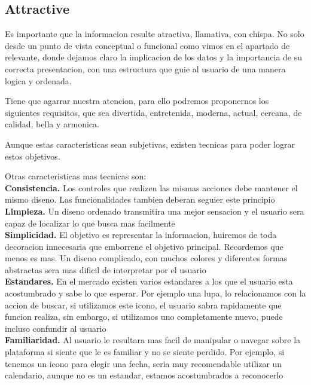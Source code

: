\subsection{Attractive}
Es importante que la informacion resulte atractiva, llamativa, con chispa. No solo desde un punto de vista conceptual
o funcional como vimos en el apartado de relevante, donde dejamos claro la implicacion de los datos y la importancia
de su correcta presentacion, con una estructura que guie al usuario de una manera logica y ordenada.

Tiene que agarrar nuestra atencion, para ello podremos proponernos los siguientes requisitos, que sea divertida, entretenida,
moderna, actual, cercana, de calidad, bella y armonica.

Aunque estas caracteristicas sean subjetivas, existen tecnicas para poder lograr estos objetivos.

Otras caracteristicas mas tecnicas son:\\
 
\textbf{Consistencia.} Los controles que realizen las mismas acciones debe mantener el mismo diseno. Las funcionalidades
tambien deberan seguier este principio\\

\textbf{Limpieza.} Un diseno ordenado transmitira una mejor sensacion y el usuario sera capaz de localizar lo que busca
mas facilmente\\

\textbf{Simplicidad.} El objetivo es representar la informacion, huiremos de toda decoracion innecesaria que emborrene
el objetivo principal. Recordemos que menos es mas. Un diseno complicado, con muchos colores y diferentes formas abstractas
sera mas dificil de interpretar por el usuario\\


\textbf{Estandares.} En el mercado existen varios estandares a los que el usuario esta acostumbrado y sabe lo que esperar.
Por ejemplo una lupa, lo relacionamos con la accion de buscar, si utilizamos este icono, el usuario sabra rapidamente que
funcion realiza, sin embargo, si utilizamos uno completamente nuevo, puede incluso confundir al usuario\\

\textbf{Familiaridad.} Al usuario le resultara mas facil de manipular o navegar sobre la plataforma si siente que 
le es familiar y no se siente perdido. Por ejemplo, si tenemos un icono para elegir una fecha, seria muy recomendable
utilizar un calendario, aunque no es un estandar, estamos acostumbrados a reconocerlo\\

